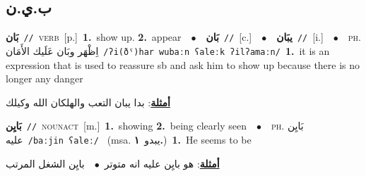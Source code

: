 \documentclass[10pt,a4paper,twoside]{article} %
\begin{document}
\begin{multicols}{2}
\vspace{-3mm}
\subsection*{\color{blue}\foreignlanguage{arabic}{ب.ي.ن}\color{blue}{}} 

{\setlength\topsep{0pt}\textbf{\foreignlanguage{arabic}{بَان}}\ {\color{gray}\texttt{//}\color{black}}\ \textsc{verb}\ [p.]\ \textbf{1.}~show up.  \textbf{2.}~appear\ \ $\bullet$\ \ \setlength\topsep{0pt}\textbf{\foreignlanguage{arabic}{بَان}}\ {\color{gray}\texttt{//}\color{black}}\ [c.]\ \ $\bullet$\ \ \setlength\topsep{0pt}\textbf{\foreignlanguage{arabic}{يبَان}}\ {\color{gray}\texttt{//}\color{black}}\ [i.]\ \ $\bullet$\ \ \textsc{ph.} \color{gray} \foreignlanguage{arabic}{اِظْهَر وبَان عَلَيك الأَمَان}\color{black}\ {\color{gray}\texttt{/{\sffamily ʔi(ðˤ)har wubaːn ʕaleːk ʔilʔamaːn}/}\color{black}}\ \textbf{1.}~it is an expression that is used to reassure sb and ask him to show up because there is no longer any danger\  \begin{flushright}\color{gray}\foreignlanguage{arabic}{\textbf{\underline{\foreignlanguage{arabic}{أمثلة}}}: بدا يبان التعب والهلكان الله وكيلك}\end{flushright}\color{black}} \vspace{2mm}

{\setlength\topsep{0pt}\textbf{\foreignlanguage{arabic}{بَايِن}}\ {\color{gray}\texttt{//}\color{black}}\ \textsc{noun\textunderscore act}\ [m.]\ \textbf{1.}~showing  \textbf{2.}~being clearly seen\ \ $\bullet$\ \ \textsc{ph.} \color{gray} \foreignlanguage{arabic}{بَايِن عليه}\color{black}\ {\color{gray}\texttt{/{\sffamily baːjin ʕaleː}/}\color{black}}\ \color{gray} (msa. \foreignlanguage{arabic}{يبدو}~\foreignlanguage{arabic}{\textbf{١.}})\color{black}\ \textbf{1.}~He seems to be\  \begin{flushright}\color{gray}\foreignlanguage{arabic}{\textbf{\underline{\foreignlanguage{arabic}{أمثلة}}}: هو بايِن عليه انه متوتر\ $\bullet$\ \  بايِن الشغل المرتب}\end{flushright}\color{black}} \vspace{2mm}


\end{multicols}
\end{document}
